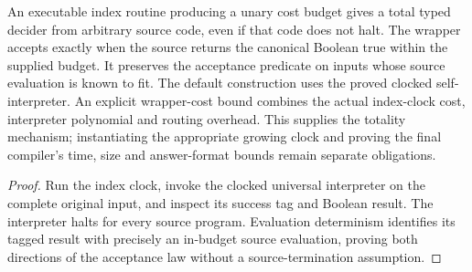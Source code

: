 \begin{lemma}
\label{lem:detype-total-clock}
\leanok
An executable index routine producing a unary cost budget gives a total
typed decider from arbitrary source code, even if that code does not halt.
The wrapper accepts exactly when the source returns the canonical Boolean
true within the supplied budget. It preserves the acceptance predicate on
inputs whose source evaluation is known to fit. The default construction uses
the proved clocked self-interpreter. An explicit wrapper-cost bound combines
the actual index-clock cost, interpreter polynomial and routing overhead.
This supplies the totality mechanism;
instantiating the appropriate growing clock and proving the final compiler's
time, size and answer-format bounds remain separate obligations.
\end{lemma}
\begin{proof}
\leanok
Run the index clock, invoke the clocked universal interpreter on the complete
original input, and inspect its success tag and Boolean result. The interpreter
halts for every source program. Evaluation determinism identifies its tagged
result with precisely an in-budget source evaluation, proving both directions
of the acceptance law without a source-termination assumption.
\end{proof}

